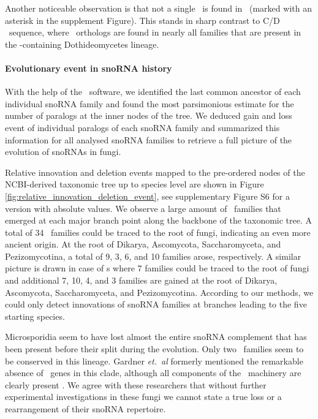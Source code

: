 Another noticeable observation is that not a single \haca\ is found in
\Ptt\ (marked with an asterisk in the supplement Figure). This stands
in sharp contrast to C/D \sno\ sequence, where \ptt\ orthologs are
found in nearly all families that are present in the \ptt-containing
Dothideomycetes lineage.


\paragraph{\textbf{Evolutionary event in snoRNA history}}

With the help of the \epope\ software, we identified the last common
ancestor of each individual snoRNA family and found the most
parsimonious estimate for the number of paralogs at the inner nodes of
the tree.  We deduced gain and loss event of individual paralogs of
each snoRNA family and summarized this information for all analysed
snoRNA families to retrieve a full picture of the evolution of snoRNAs
in fungi.

Relative innovation and deletion events mapped to the pre-ordered
nodes of the NCBI-derived taxonomic tree up to species level are shown
in Figure \ref{fig:relative_innovation_deletion_event}, see
supplementary Figure S6 for a version with absolute values.  We
observe a large amount of \sno\ families that emerged at each major
branch point along the backbone of the taxonomic tree. A total of 34
\cd\ families could be traced to the root of fungi, indicating an even
more ancient origin. At the root of Dikarya, Ascomycota,
Saccharomyceta, and Pezizomycotina, a total of 9, 3, 6, and 10
families arose, respectively. A similar picture is drawn in case of
\haca s where 7 families could be traced to the root of fungi and
additional 7, 10, 4, and 3 families are gained at the root of Dikarya,
Ascomycota, Saccharomyceta, and Pezizomycotina.  According to our
methods, we could only detect innovations of snoRNA families at
branches leading to the five starting species.

Microsporidia seem to have lost almost the entire snoRNA complement
that has been present before their split during the evolution.  Only
two \cd\ families seem to be conserved in this lineage.  Gardner
\emph{et.~al} formerly mentioned the remarkable absence of \sno\ genes
in this clade, although all components of the \sno\ machinery are
clearly present \cite{Gardner:2010}.  We agree with these researchers
that without further experimental investigations in these fungi we
cannot state a true loss or a rearrangement of their snoRNA
repertoire.

